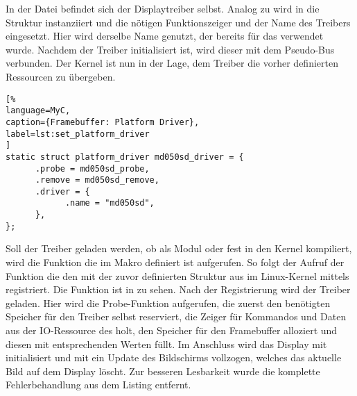 In der Datei  befindet sich der Displaytreiber selbst. Analog zu  wird in  die Struktur instanziiert und die nötigen Funktionszeiger und der Name des Treibers eingesetzt. Hier wird derselbe Name genutzt, der bereits für das  verwendet wurde. Nachdem der Treiber initialisiert ist, wird dieser mit dem Pseudo-Bus verbunden. Der Kernel ist nun in der Lage, dem Treiber die vorher definierten Ressourcen zu übergeben.

\begin{lstlisting}[%
language=MyC,
caption={Framebuffer: Platform Driver},
label=lst:set_platform_driver
]
static struct platform_driver md050sd_driver = {
      .probe = md050sd_probe,
      .remove = md050sd_remove,
      .driver = {
            .name = "md050sd",
      },
};
\end{lstlisting}

Soll der Treiber geladen werden, ob als Modul oder fest in den Kernel kompiliert, wird die Funktion die im Makro  definiert ist aufgerufen. So folgt der Aufruf der Funktion  die den  mit der zuvor definierten Struktur  aus  im Linux-Kernel mittels 
 registriert. Die Funktion  ist in  zu sehen. 
Nach der Registrierung wird der Treiber geladen. Hier wird die Probe-Funktion  aufgerufen, die zuerst den benötigten Speicher für den Treiber selbst reserviert, die Zeiger für Kommandos und Daten aus der IO-Ressource des  holt, den Speicher für den Framebuffer alloziert und diesen mit entsprechenden Werten füllt. Im Anschluss wird das Display mit  initialisiert und mit  ein Update des Bildschirms vollzogen, welches das aktuelle Bild auf dem Display löscht. Zur besseren Lesbarkeit wurde die komplette Fehlerbehandlung aus dem Listing entfernt. 

